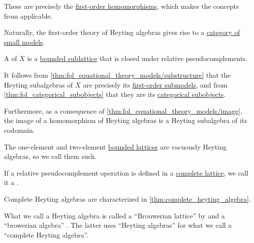 \begin{definition}
\begin{thmenum}[resume=def:heyting_algebra]
    These are precisely the \hyperref[def:fol_homomorphism]{first-order homomorphisms}, which makes the concepts from  applicable.

    \mimprovised Naturally, the first-order theory of Heyting algebras gives rise to a \hyperref[def:fol_theory_model_functor/obj]{category of small models}.

    \mimprovised A  of \( X \) is a \hyperref[def:bounded_lattice/subobject]{bounded sublattice} that is closed under relative pseudocomplements.

    It follows from \cref{thm:fol_equational_theory_models/substructure} that the Heyting subalgebras of \( X \) are precisely its \hyperref[def:fol_substructure/submodel]{first-order submodels}, and from \cref{thm:fol_categorical_subobjects} that they are its \hyperref[def:categorical_subobject]{categorical subobjects}.

    Furthermore, as a consequence of \cref{thm:fol_equational_theory_models/image}, the image of a homomorphism of Heyting algebras is a Heyting subalgebra of its codomain.

    \mimprovised The one-element and two-element \hyperref[def:bounded_lattice/trivial]{bounded lattices} are vacuously Heyting algebras, so we call them such.

     If a relative pseudocomplement operation is defined in a \hyperref[def:complete_lattice]{complete lattice}, we call it a .

    Complete Heyting algebras are characterized in \cref{thm:complete_heyting_algebra}.
  \end{thmenum}
\end{definition}
\begin{comments}
  \item What we call a Heyting algebra is called a \enquote{Brouwerian lattice} by \textcite[147]{Birkhoff1967LatticeTheory} and a \enquote{browerian algebra} \textcite[7]{Golan1999Semirings}. The latter uses \enquote{Heyting algebras} for what we call a \enquote{complete Heyting algebra}.
\end{comments}
